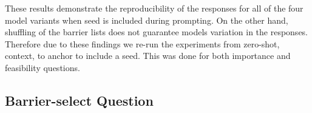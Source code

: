 \documentclass[manuscript,review,anonymous]{acmart}
\begin{document}
These results demonstrate the reproducibility of the responses for all of the four model variants when seed is included during prompting. 
On the other hand, shuffling of the barrier lists does not guarantee models variation in the responses. 
Therefore due to these findings we re-run the experiments from zero-shot, context, to anchor to include a seed. This was done for both importance and feasibility questions. 


\subsection{Barrier-select Question}
\end{document}
